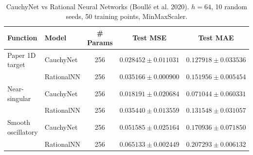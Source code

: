 \begin{table}[ht]\centering
\caption{CauchyNet vs Rational Neural Networks (Boull\'e et al. 2020).
$h=64$, 10 random seeds, 50 training points, MinMaxScaler.}
\label{tab:rational}
\begin{tabular}{llccc}
\toprule
Function & Model & \# Params & Test MSE & Test MAE \\
\midrule
Paper 1D target & CauchyNet & 256 & $0.028452 \pm 0.011031$ & $0.127918 \pm 0.033536$ \\
 & RationalNN & 256 & $0.035166 \pm 0.000900$ & $0.151956 \pm 0.005454$ \\
\midrule
Near-singular & CauchyNet & 256 & $0.018191 \pm 0.020684$ & $0.071044 \pm 0.060331$ \\
 & RationalNN & 256 & $0.035440 \pm 0.013559$ & $0.131548 \pm 0.031057$ \\
\midrule
Smooth oscillatory & CauchyNet & 256 & $0.051585 \pm 0.025164$ & $0.170936 \pm 0.071850$ \\
 & RationalNN & 256 & $0.065133 \pm 0.002449$ & $0.207293 \pm 0.006132$ 
\bottomrule
\end{tabular}
\end{table}